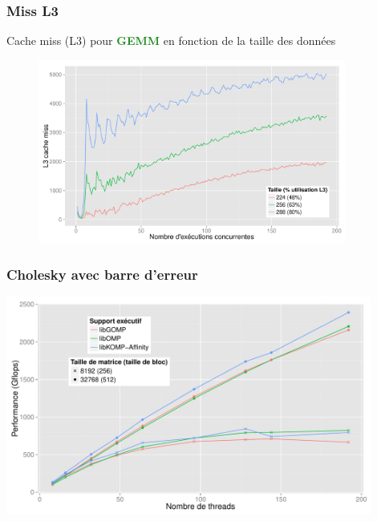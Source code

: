 \documentclass[xcolor={usenames,dvipsnames,svgnames,table}, aspectratio=43]{beamer}
\newcommand{\gemmcolor}[1]{\textcolor{ForestGreen}{\textbf{#1}}\xspace}
\newcommand{\gemm}{\gemmcolor{GEMM}}
\begin{document}
\begin{frame}
  \frametitle{Miss L3}

  Cache miss (L3) pour \gemm en fonction de la taille des données
  \begin{figure}
    \centering
    \includegraphics[width=0.9\textwidth]{graph/dgemm_local_miss.pdf}
  \end{figure}


\end{frame}

\begin{frame}
  \frametitle{Cholesky avec barre d'erreur}

  \includegraphics[width=0.9\textwidth]{graph/graph_all_cholesky_idchire.pdf}

\end{frame}
\end{document}
